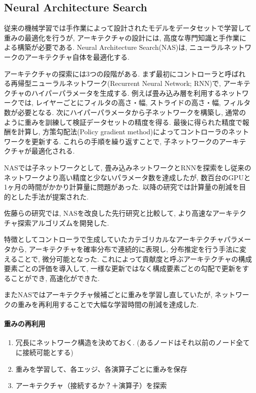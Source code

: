 \documentclass[twocolumn]{jarticle}     %
\begin{document}
\subsection{Neural Architecture Search}
従来の機械学習では手作業によって設計されたモデルをデータセットで学習して重みの最適化を行うが, アーキテクチャの設計には, 高度な専門知識と手作業による構築が必要である.
Neural Architecture Search(NAS)\cite{DBLP:journals/corr/ZophL16}は, ニューラルネットワークのアーキテクチャ自体を最適化する.


アーキテクチャの探索には3つの段階がある.
まず最初にコントローラと呼ばれる再帰型ニューラルネットワーク(Recurrent Neural Network; RNN)で, アーキテクチャのハイパーパラメータを生成する.
例えば畳み込み層を利用するネットワークでは, レイヤーごとにフィルタの高さ・幅, ストライドの高さ・幅, フィルタ数が必要となる.
次にハイパーパラメータから子ネットワークを構築し, 通常のように重みを訓練して検証データセットの精度を得る.
最後に得られた精度で報酬を計算し, 方策勾配法(Policy gradient method)によってコントローラのネットワークを更新する.
これらの手順を繰り返すことで, 子ネットワークのアーキテクチャが最適化される.

NASでは子ネットワークとして, 畳み込みネットワークとRNNを探索をし従来のネットワークより高い精度と少ないパラメータ数を達成したが, 数百台のGPUと1ヶ月の時間がかかり計算量に問題があった.
以降の研究では計算量の削減を目的とした手法が提案された.

佐藤ら\cite{ANAS}の研究では, NASを改良した先行研究と比較して, より高速なアーキテクチャ探索アルゴリズムを開発した.

特徴としてコントローラで生成していたカテゴリカルなアーキテクチャパラメータから,
アーキテクチャを確率分布で連続的に表現し, 分布推定を行う手法に変えることで, 微分可能となった.
これによって貢献度と呼ぶアーキテクチャの構成要素ごとの評価を導入して, 一様な更新ではなく構成要素ごとの勾配で更新をすることができ, 高速化ができた.

またNASではアーキテクチャ候補ごとに重みを学習し直していたが, ネットワークの重みを再利用することで大幅な学習時間の削減を達成した.

\paragraph{重みの再利用}
\begin{enumerate}
  \item 冗長にネットワーク構造を決めておく. (あるノードはそれ以前のノード全てに接続可能とする)
  \item 重みを学習して、各エッジ、各演算子ごとに重みを保存
  \item アーキテクチャ（接続するか？＋演算子）を探索
\end{enumerate}
\end{document}
